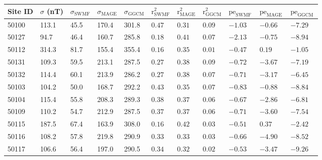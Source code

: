 \begin{tabular}{l p{1cm} p{1cm} p{1cm} p{1cm} p{1cm} p{1cm} p{1cm} p{1cm} p{1cm} p{1cm}}
Site ID & $\sigma$ (nT) & $\sigma_\text{SWMF}$ & $\sigma_\text{MAGE}$ & $\sigma_\text{GGCM}$ & $\text{r}^2_\text{SWMF}$ & $\text{r}^2_\text{MAGE}$ & $\text{r}^2_\text{GGCM}$ & $\text{pe}_\text{SWMF}$ & $\text{pe}_\text{MAGE}$ & $\text{pe}_\text{GGCM}$ \\
\hline
50100 & 113.1 & 45.5 & 170.4 & 301.8 & $0.47\phantom{*}$ & $0.31\phantom{*}$ & $0.09\phantom{*}$ & $-1.03\phantom{*}$ & $-0.66\phantom{*}$ & $-7.29\phantom{*}$ \\
50127 & 94.7 & 46.4 & 160.7 & 285.8 & $0.18\phantom{*}$ & $0.41\phantom{*}$ & $0.07\phantom{*}$ & $-2.13\phantom{*}$ & $-0.75\phantom{*}$ & $-8.94\phantom{*}$ \\
50112 & 314.3 & 81.7 & 155.4 & 355.4 & $0.16\phantom{*}$ & $0.35\phantom{*}$ & $0.01\phantom{*}$ & $-0.47\phantom{*}$ & $0.19\phantom{*}$ & $-1.05\phantom{*}$ \\
50131 & 109.3 & 59.5 & 213.1 & 287.5 & $0.27\phantom{*}$ & $0.38\phantom{*}$ & $0.09\phantom{*}$ & $-0.72\phantom{*}$ & $-3.67\phantom{*}$ & $-7.19\phantom{*}$ \\
50132 & 114.4 & 60.1 & 213.9 & 286.2 & $0.27\phantom{*}$ & $0.38\phantom{*}$ & $0.07\phantom{*}$ & $-0.71\phantom{*}$ & $-3.17\phantom{*}$ & $-6.45\phantom{*}$ \\
50103 & 104.2 & 50.0 & 168.7 & 292.2 & $0.43\phantom{*}$ & $0.35\phantom{*}$ & $0.07\phantom{*}$ & $-0.83\phantom{*}$ & $-0.88\phantom{*}$ & $-8.84\phantom{*}$ \\
50104 & 115.4 & 55.8 & 208.3 & 289.3 & $0.38\phantom{*}$ & $0.37\phantom{*}$ & $0.06\phantom{*}$ & $-0.67\phantom{*}$ & $-2.86\phantom{*}$ & $-6.81\phantom{*}$ \\
50109 & 110.2 & 54.7 & 212.9 & 287.5 & $0.37\phantom{*}$ & $0.37\phantom{*}$ & $0.06\phantom{*}$ & $-0.71\phantom{*}$ & $-3.60\phantom{*}$ & $-7.54\phantom{*}$ \\
50115 & 187.5 & 67.4 & 163.9 & 308.0 & $0.16\phantom{*}$ & $0.42\phantom{*}$ & $0.03\phantom{*}$ & $-0.51\phantom{*}$ & $0.37\phantom{*}$ & $-2.42\phantom{*}$ \\
50116 & 108.2 & 57.8 & 219.8 & 290.9 & $0.33\phantom{*}$ & $0.33\phantom{*}$ & $0.03\phantom{*}$ & $-0.66\phantom{*}$ & $-4.90\phantom{*}$ & $-8.52\phantom{*}$ \\
50117 & 106.6 & 56.4 & 197.0 & 290.5 & $0.34\phantom{*}$ & $0.32\phantom{*}$ & $0.02\phantom{*}$ & $-0.53\phantom{*}$ & $-3.47\phantom{*}$ & $-9.26\phantom{*}$ \\

\end{tabular}
